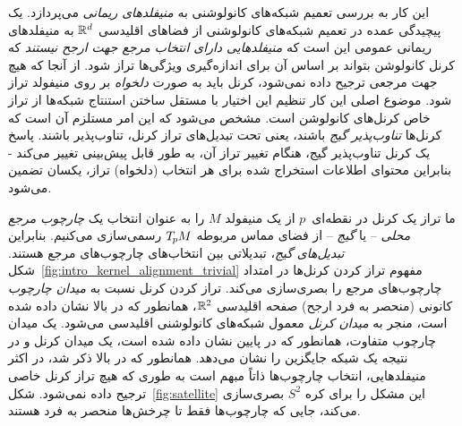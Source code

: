 این کار به بررسی تعمیم شبکه‌های کانولوشنی به \emph{منیفلدهای ریمانی} می‌پردازد.
یک پیچیدگی عمده در تعمیم شبکه‌های کانولوشنی از فضاهای اقلیدسی $\mathbb{R}^d$ به منیفلدهای ریمانی عمومی این است که \emph{منیفلدهایی دارای انتخاب مرجع جهت ارجح نیستند} که کرنل کانولوشن بتواند بر اساس آن برای اندازه‌گیری ویژگی‌ها تراز شود.
از آنجا که هیچ جهت مرجعی ترجیح داده نمی‌شود، کرنل باید به صورت \emph{دلخواه} بر روی منیفولد تراز شود.
موضوع اصلی این کار تنظیم این اختیار با مستقل ساختن استنتاج شبکه‌ها از تراز خاص کرنل‌های کانولوشن است.
مشخص می‌شود که این امر مستلزم آن است که کرنل‌ها \emph{تناوب‌پذیر گیج} باشند، یعنی تحت تبدیل‌های تراز کرنل، تناوب‌پذیر باشند.
پاسخ یک کرنل تناوب‌پذیر گیج، هنگام تغییر تراز آن، به طور قابل پیش‌بینی تغییر می‌کند - بنابراین محتوای اطلاعات استخراج شده برای هر انتخاب (دلخواه) تراز، یکسان تضمین می‌شود.


ما تراز یک کرنل در نقطه‌ای~$p$ از یک منیفولد $M$ را به عنوان انتخاب یک \emph{چارچوب مرجع محلی} – یا \emph{گیج} – از فضای مماس مربوطه $T_{\mkern-1.5mu p}\mkern-.5muM$ رسمی‌سازی می‌کنیم.
بنابراین \emph{تبدیل‌های گیج}، تبدیلاتی بین انتخاب‌های چارچوب‌های مرجع هستند.
شکل~\ref{fig:intro_kernel_alignment_trivial} مفهوم تراز کردن کرنل‌ها در امتداد چارچوب‌های مرجع را بصری‌سازی می‌کند.
تراز کردن کرنل نسبت به \emph{میدان چارچوب} کانونی (منحصر به فرد ارجح) صفحه اقلیدسی $\mathbb{R}^2$، همانطور که در بالا نشان داده شده است، منجر به \emph{میدان کرنل} معمول شبکه‌های کانولوشنی اقلیدسی می‌شود.
یک میدان چارچوب متفاوت، همانطور که در پایین نشان داده شده است، یک میدان کرنل و در نتیجه یک شبکه جایگزین را نشان می‌دهد.
همانطور که در بالا ذکر شد، در اکثر منیفلدهایی، انتخاب چارچوب‌ها ذاتاً مبهم است به طوری که هیچ تراز کرنل خاصی ترجیح داده نمی‌شود.
شکل~\ref{fig:satellite} این مشکل را برای کره $S^2$ بصری‌سازی می‌کند، جایی که چارچوب‌ها فقط تا چرخش‌ها منحصر به فرد هستند.


